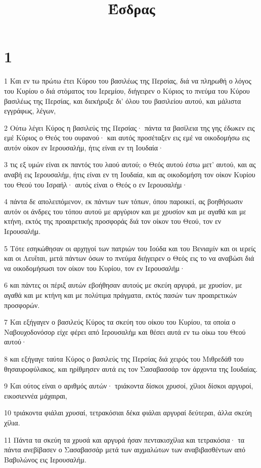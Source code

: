 

\title{Έσδρας}


\chapter{1}

\par 1 Και εν τω πρώτω έτει Κύρου του βασιλέως της Περσίας, διά να πληρωθή ο λόγος του Κυρίου ο διά στόματος του Ιερεμίου, διήγειρεν ο Κύριος το πνεύμα του Κύρου βασιλέως της Περσίας, και διεκήρυξε δι' όλου του βασιλείου αυτού, και μάλιστα εγγράφως, λέγων,
\par 2 Ούτω λέγει Κύρος η βασιλεύς της Περσίας· πάντα τα βασίλεια της γης έδωκεν εις εμέ Κύριος ο Θεός του ουρανού· και αυτός προσέταξεν εις εμέ να οικοδομήσω εις αυτόν οίκον εν Ιερουσαλήμ, ήτις είναι εν τη Ιουδαία·
\par 3 τις εξ υμών είναι εκ παντός του λαού αυτού; ο Θεός αυτού έστω μετ' αυτού, και ας αναβή εις Ιερουσαλήμ, ήτις είναι εν τη Ιουδαία, και ας οικοδομήση τον οίκον Κυρίου του Θεού του Ισραήλ· αυτός είναι ο Θεός ο εν Ιερουσαλήμ·
\par 4 πάντα δε απολειπόμενον, εκ πάντων των τόπων, όπου παροικεί, ας βοηθήσωσιν αυτόν οι άνδρες του τόπου αυτού με αργύριον και με χρυσίον και με αγαθά και με κτήνη, εκτός της προαιρετικής προσφοράς διά τον οίκον του Θεού, τον εν Ιερουσαλήμ.
\par 5 Τότε εσηκώθησαν οι αρχηγοί των πατριών του Ιούδα και του Βενιαμίν και οι ιερείς και οι Λευΐται, μετά πάντων όσων το πνεύμα διήγειρεν ο Θεός εις το να αναβώσι διά να οικοδομήσωσι τον οίκον του Κυρίου, τον εν Ιερουσαλήμ·
\par 6 και πάντες οι πέριξ αυτών εβοήθησαν αυτούς με σκεύη αργυρά, με χρυσίον, με αγαθά και με κτήνη και με πολύτιμα πράγματα, εκτός πασών των προαιρετικών προσφορών.
\par 7 Και εξήγαγεν ο βασιλεύς Κύρος τα σκεύη του οίκου του Κυρίου, τα οποία ο Ναβουχοδονόσορ είχε φέρει από Ιερουσαλήμ και θέσει αυτά εν τω οίκω του Θεού αυτού·
\par 8 και εξήγαγε ταύτα Κύρος ο βασιλεύς της Περσίας διά χειρός του Μιθρεδάθ του θησαυροφύλακος, και ηρίθμησεν αυτά εις τον Σασαβασσάρ τον άρχοντα της Ιουδαίας.
\par 9 Και ούτος είναι ο αριθμός αυτών· τριάκοντα δίσκοι χρυσοί, χίλιοι δίσκοι αργυροί, εικοσιεννέα μάχαιραι,
\par 10 τριάκοντα φιάλαι χρυσαί, τετρακόσιαι δέκα φιάλαι αργυραί δεύτεραι, άλλα σκεύη χίλια.
\par 11 Πάντα τα σκεύη τα χρυσά και αργυρά ήσαν πεντακισχίλια και τετρακόσια· τα πάντα ανεβίβασεν ο Σασαβασσάρ μετά των αιχμαλώτων των αναβιβασθέντων από Βαβυλώνος εις Ιερουσαλήμ.

